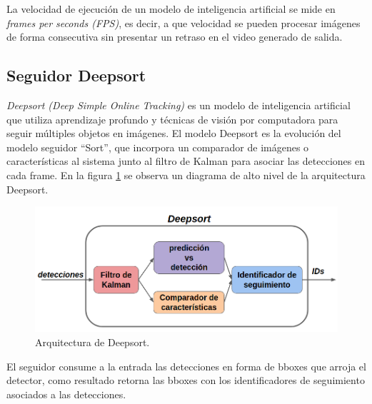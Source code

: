 La velocidad de ejecución de un modelo de inteligencia artificial se mide en \textit{frames per seconds (FPS)}, es decir, a que velocidad se pueden procesar imágenes de forma consecutiva sin presentar un retraso en el video generado de salida.

\subsection{Seguidor Deepsort}

\textit{Deepsort (Deep Simple Online Tracking)} \citep{DEEPSORT_PAPER} es un modelo de inteligencia artificial que utiliza aprendizaje profundo y técnicas de visión por computadora para seguir múltiples objetos en imágenes. El modelo Deepsort es la evolución del modelo seguidor ``Sort'', que incorpora un comparador de imágenes o características al sistema junto al filtro de Kalman \citep{KALMAN_FILTER} para asociar las detecciones en cada frame. En la figura \ref{fig:deepsortArq} se observa un diagrama de alto nivel de la arquitectura Deepsort.

\begin{figure}[ht]
	\centering
	\includegraphics[scale=.55]{./Figures/deepsort.png}
	\caption{Arquitectura de Deepsort\protect\footnotemark.}
	\label{fig:deepsortArq}
\end{figure}


El seguidor consume a la entrada las detecciones en forma de bboxes que arroja el detector, como resultado retorna las bboxes con los identificadores de seguimiento asociados a las detecciones.

\newpage

